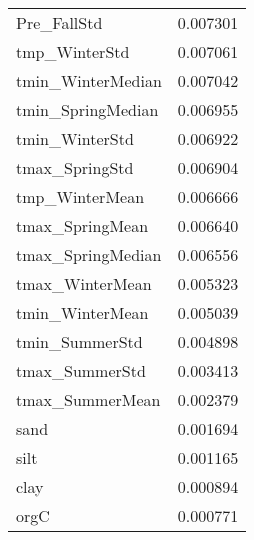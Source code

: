 \begin{tabular}{lr}
Pre_FallStd & 0.007301 \\
tmp_WinterStd & 0.007061 \\
tmin_WinterMedian & 0.007042 \\
tmin_SpringMedian & 0.006955 \\
tmin_WinterStd & 0.006922 \\
tmax_SpringStd & 0.006904 \\
tmp_WinterMean & 0.006666 \\
tmax_SpringMean & 0.006640 \\
tmax_SpringMedian & 0.006556 \\
tmax_WinterMean & 0.005323 \\
tmin_WinterMean & 0.005039 \\
tmin_SummerStd & 0.004898 \\
tmax_SummerStd & 0.003413 \\
tmax_SummerMean & 0.002379 \\
sand & 0.001694 \\
silt & 0.001165 \\
clay & 0.000894 \\
orgC & 0.000771 \\
\bottomrule
\end{tabular}
